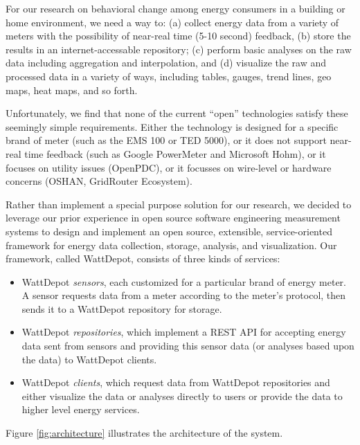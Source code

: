 \documentclass[conference,compsoc]{IEEEtran}
\begin{document}
For our research on behavioral change among energy consumers in a building
or home environment, we need a way to: (a) collect energy data from a
variety of meters with the possibility of near-real time (5-10 second)
feedback, (b) store the results in an internet-accessable repository; (c)
perform basic analyses on the raw data including aggregation and
interpolation, and (d) visualize the raw and processed data in a variety of
ways, including tables, gauges, trend lines, geo maps, heat maps, and so forth.

Unfortunately, we find that none of the current ``open'' technologies
satisfy these seemingly simple requirements. Either the technology is
designed for a specific brand of meter (such as the EMS 100 or TED 5000), or it does not
support near-real time feedback (such as Google PowerMeter and Microsoft
Hohm), or it focuses on utility issues (OpenPDC), or it focusses on
wire-level or hardware concerns (OSHAN, GridRouter Ecosystem).

Rather than implement a special purpose solution for our research, we
decided to leverage our prior experience in open source software
engineering measurement systems to design and implement an open source,
extensible, service-oriented framework for energy data collection, storage,
analysis, and visualization. Our framework, called WattDepot, consists of
three kinds of services:

\begin{itemize}
\item WattDepot {\em sensors}, each customized for a particular brand of
energy meter.  A sensor requests data from a meter according to the meter's
protocol, then sends it to a WattDepot repository for storage.

\item WattDepot {\em repositories}, which implement a REST \cite{REST} API
for accepting energy data sent from sensors and providing this sensor data
(or analyses based upon the data) to WattDepot clients.

\item WattDepot {\em clients}, which request data from WattDepot
repositories and either visualize the data or analyses directly to users or
provide the data to higher level energy services.
\end{itemize}

Figure \ref{fig:architecture} illustrates the architecture of the system.
\end{document}
